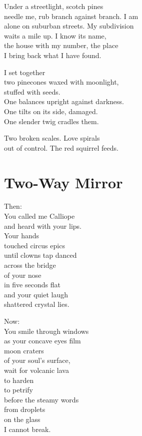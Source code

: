 \documentclass[twoside,10pt]{book}
\begin{document}
Under a streetlight, scotch pines\\
needle me, rub branch against branch. I am\\
alone on suburban streets. My subdivision\\
waits a mile up. I know its name,\\
the house with my number, the place\\
I bring back what I have found.

I set together\\
two pinecones waxed with moonlight,\\
stuffed with seeds.\\
One balances upright against darkness.\\
One tilts on its side, damaged.\\
One slender twig cradles them.

Two broken scales. Love spirals\\
out of control. The red squirrel feeds.


\clearpage
\section{Two-Way Mirror}

Then:\\
You called me Calliope\\
and heard with your lips.\\
Your hands\\
touched circus epics\\
until clowns tap danced\\
across the bridge\\
of your nose\\
in five seconds flat\\
and your quiet laugh\\
shattered crystal lies.

Now:\\
You smile through windows\\
as your concave eyes film\\
moon craters\\
of your soul's surface,\\
wait for volcanic lava\\
to harden\\
to petrify\\
before the steamy words\\
from droplets\\
on the glass\\
I cannot break.
\end{document}
